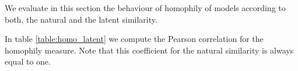 \documentclass[a4paper, 12pt]{article}
\begin{document}
%
%


We evaluate in this section the behaviour of homophily of models according to both, the natural and the latent similarity.

In table  \ref{table:homo_latent} we compute the Pearson correlation for the homophily measure. Note that this coefficient for the natural similarity is always equal to one.
\end{document}
